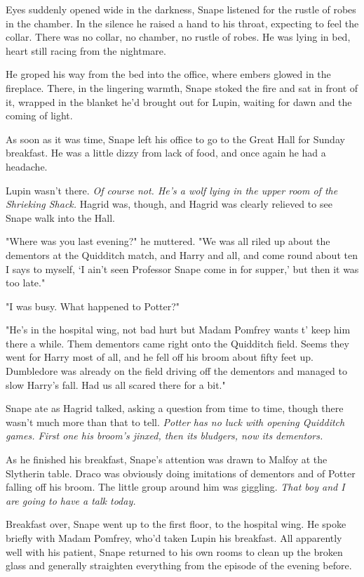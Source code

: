 Eyes suddenly opened wide in the darkness, Snape listened for the rustle of robes in the chamber. In the silence he raised a hand to his throat, expecting to feel the collar. There was no collar, no chamber, no rustle of robes. He was lying in bed, heart still racing from the nightmare.

He groped his way from the bed into the office, where embers glowed in the fireplace. There, in the lingering warmth, Snape stoked the fire and sat in front of it, wrapped in the blanket he'd brought out for Lupin, waiting for dawn and the coming of light.

As soon as it was time, Snape left his office to go to the Great Hall for Sunday breakfast. He was a little dizzy from lack of food, and once again he had a headache.

Lupin wasn't there. \emph{Of course not. He's a wolf lying in the upper room of the Shrieking Shack.} Hagrid was, though, and Hagrid was clearly relieved to see Snape walk into the Hall.

"Where was you last evening?" he muttered. "We was all riled up about the dementors at the Quidditch match, and Harry and all, and come round about ten I says to myself, `I ain't seen Professor Snape come in for supper,' but then it was too late."

"I was busy. What happened to Potter?"

"He's in the hospital wing, not bad hurt but Madam Pomfrey wants t' keep him there a while. Them dementors came right onto the Quidditch field. Seems they went for Harry most of all, and he fell off his broom about fifty feet up. Dumbledore was already on the field driving off the dementors and managed to slow Harry's fall. Had us all scared there for a bit."

Snape ate as Hagrid talked, asking a question from time to time, though there wasn't much more than that to tell. \emph{Potter has no luck with opening Quidditch games. First one his broom's jinxed, then its bludgers, now its dementors.}

As he finished his breakfast, Snape's attention was drawn to Malfoy at the Slytherin table. Draco was obviously doing imitations of dementors and of Potter falling off his broom. The little group around him was giggling. \emph{That boy and I are going to have a talk today.}

Breakfast over, Snape went up to the first floor, to the hospital wing. He spoke briefly with Madam Pomfrey, who'd taken Lupin his breakfast. All apparently well with his patient, Snape returned to his own rooms to clean up the broken glass and generally straighten everything from the episode of the evening before.

